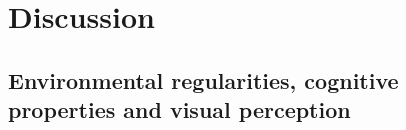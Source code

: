 \documentclass[12pt,english]{article}%
\newcommand{\citep}[1]{\parencite{#1}}
\newcommand{\AM}[1]{\textbf{\textcolor{blue}{[AM: #1]}}}
\begin{document}
\section{Discussion}
\label{sec:outro}





\subsection{Environmental regularities, cognitive properties and visual perception}
\end{document}
